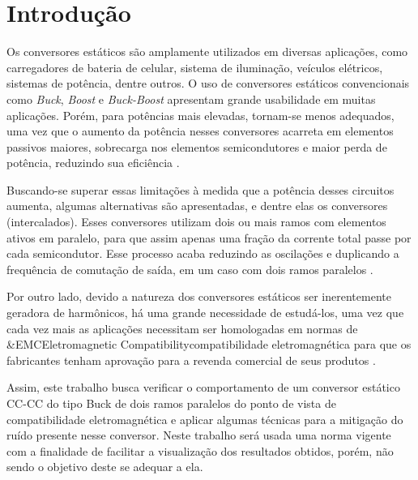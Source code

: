 \chapter{Introdução}
    
    Os conversores estáticos são amplamente utilizados em diversas aplicações, como carregadores de bateria de celular, sistema de iluminação, veículos elétricos, sistemas de potência, dentre outros. O uso de conversores estáticos convencionais como \textit{Buck}, \textit{Boost} e \textit{Buck-Boost} apresentam grande usabilidade em muitas aplicações. Porém, para potências mais elevadas, tornam-se menos adequados, uma vez que o aumento da potência nesses conversores acarreta em elementos passivos maiores, sobrecarga nos elementos semicondutores e maior perda de potência, reduzindo sua eficiência \cite{ref:BI_artigo_Falcondes}.
    
    Buscando-se superar essas limitações à medida que a potência desses circuitos aumenta, algumas alternativas são apresentadas, e dentre elas os conversores \interleaved (intercalados). Esses conversores utilizam dois ou mais ramos com elementos ativos em paralelo, para que assim apenas uma fração da corrente total passe por cada semicondutor. Esse processo acaba reduzindo as oscilações e duplicando a frequência de comutação de saída, em um caso com dois ramos paralelos \cite{ref:BI_artigo_Falcondes}.
    
    Por outro lado, devido a natureza dos conversores estáticos ser inerentemente geradora de harmônicos, há uma grande necessidade de estudá-los, uma vez que cada vez mais as aplicações necessitam ser homologadas em normas de \abreviatura&{EMC}{Eletromagnetic Compatibility}{compatibilidade eletromagnética} para que os fabricantes tenham aprovação para a revenda comercial de seus produtos \cite{ref:EMC_artigo_Texas}.
    
    Assim, este trabalho busca verificar o comportamento de um conversor estático \mbox{CC-CC} do tipo Buck \interleaved de dois ramos paralelos do ponto de vista de compatibilidade eletromagnética e aplicar algumas técnicas para a mitigação do ruído presente nesse conversor. Neste trabalho será usada uma norma vigente com a finalidade de facilitar a visualização dos resultados obtidos, porém, não sendo o objetivo deste se adequar a ela.
    
